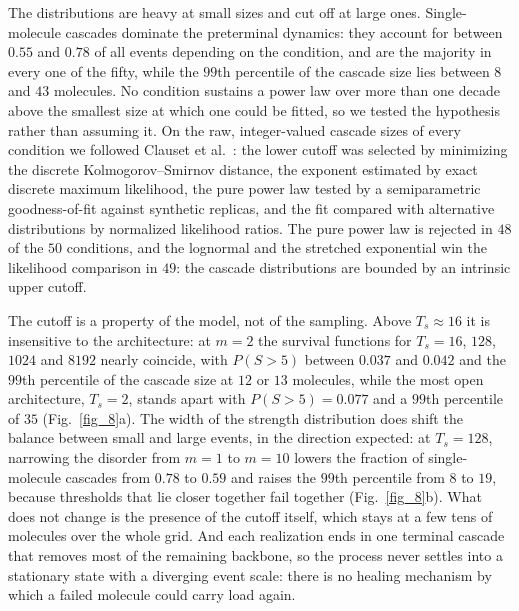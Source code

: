 \documentclass[aps,physrev,preprint,groupedaddress,linenumbers]{revtex4-2}
\newcommand{\rev}[1]{{\color{blue}#1}}
\begin{document}
\rev{The distributions are heavy at small sizes and cut off at large ones. Single-molecule cascades dominate the preterminal dynamics: they account for between $0.55$ and $0.78$ of all events depending on the condition, and are the majority in every one of the fifty, while the $99$th percentile of the cascade size lies between $8$ and $43$ molecules. No condition sustains a power law over more than one decade above the smallest size at which one could be fitted, so we tested the hypothesis rather than assuming it. On the raw, integer-valued cascade sizes of every condition we followed Clauset et al.~\cite{Clauset2009}: the lower cutoff was selected by minimizing the discrete Kolmogorov--Smirnov distance, the exponent estimated by exact discrete maximum likelihood, the pure power law tested by a semiparametric goodness-of-fit against synthetic replicas, and the fit compared with alternative distributions by normalized likelihood ratios. The pure power law is rejected in $48$ of the $50$ conditions, and the lognormal and the stretched exponential win the likelihood comparison in $49$: the cascade distributions are bounded by an intrinsic upper cutoff.}

\rev{The cutoff is a property of the model, not of the sampling. Above $T_s \approx 16$ it is insensitive to the architecture: at $m = 2$ the survival functions for $T_s = 16$, $128$, $1024$ and $8192$ nearly coincide, with $P(S>5)$ between $0.037$ and $0.042$ and the $99$th percentile of the cascade size at $12$ or $13$ molecules, while the most open architecture, $T_s = 2$, stands apart with $P(S>5) = 0.077$ and a $99$th percentile of $35$ (Fig.~\ref{fig_8}a). The width of the strength distribution does shift the balance between small and large events, in the direction expected: at $T_s = 128$, narrowing the disorder from $m = 1$ to $m = 10$ lowers the fraction of single-molecule cascades from $0.78$ to $0.59$ and raises the $99$th percentile from $8$ to $19$, because thresholds that lie closer together fail together (Fig.~\ref{fig_8}b). What does not change is the presence of the cutoff itself, which stays at a few tens of molecules over the whole grid. And each realization ends in one terminal cascade that removes most of the remaining backbone, so the process never settles into a stationary state with a diverging event scale: there is no healing mechanism by which a failed molecule could carry load again.}

\end{document}
